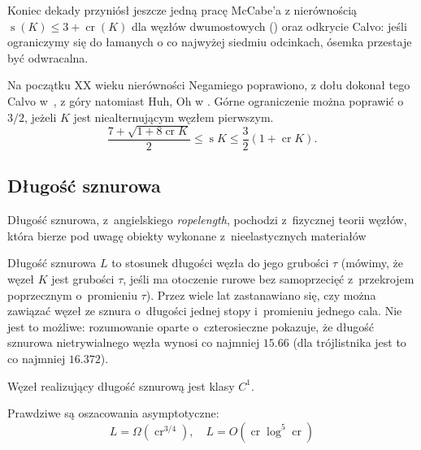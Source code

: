 Koniec dekady przyniósł jeszcze jedną pracę McCabe'a z nierównością $\operatorname{s}(K) \le 3 + \operatorname{cr} (K)$ dla węzłów dwumostowych (\cite{mccabe98}) oraz odkrycie Calvo: jeśli ograniczymy się do łamanych o co najwyżej siedmiu odcinkach, ósemka przestaje być odwracalna.

Na początku XX wieku nierówności Negamiego poprawiono, z dołu dokonał tego Calvo w~\cite{calvo01}, z góry natomiast Huh, Oh w \cite{huh11}.
Górne ograniczenie można poprawić o $3/2$, jeżeli $K$ jest niealternującym węzłem pierwszym.
\begin{equation}
    \frac{7+\sqrt{1 + 8 \operatorname{cr} K}}{2} \le \operatorname{s} K \le \frac{3}{2} (1 + \operatorname{cr} K).
\end{equation}


\subsection{Długość sznurowa} %
\label{sub:ropelength}
Długość sznurowa, z~angielskiego \emph{ropelength}, pochodzi z~fizycznej teorii węzłów, która bierze pod uwagę obiekty wykonane z~nieelastycznych materiałów

Długość sznurowa $L$ to stosunek długości węzła do jego grubości $\tau$ (mówimy, że węzeł $K$ jest grubości $\tau$, jeśli ma otoczenie rurowe bez samoprzecięć z~przekrojem poprzecznym o~promieniu $\tau$).
Przez wiele lat zastanawiano się, czy można zawiązać węzeł ze sznura o~długości jednej stopy i~promieniu jednego cala.
Nie jest to możliwe: rozumowanie oparte o~czterosieczne pokazuje, że długość sznurowa nietrywialnego węzła wynosi co najmniej $15.66$ (dla trójlistnika jest to co najmniej $16.372$).

Węzeł realizujący długość sznurową jest klasy $C^1$.

Prawdziwe są oszacowania asymptotyczne:
\[
    L = \Omega (\operatorname{cr}^{3/4}),  \quad
    L = O(\operatorname{cr} \log^5 \operatorname{cr})
\]


